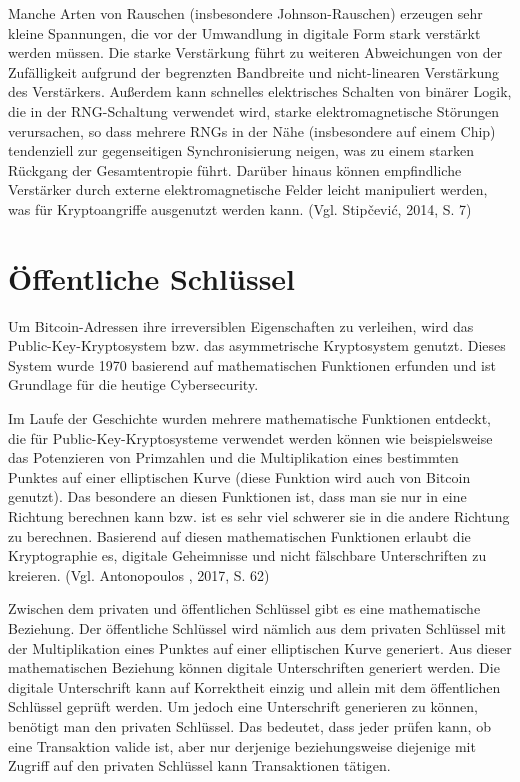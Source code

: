 Manche Arten von Rauschen (insbesondere Johnson-Rauschen) erzeugen sehr kleine Spannungen, die vor der Umwandlung in digitale Form stark verstärkt
werden müssen. Die starke Verstärkung führt zu weiteren Abweichungen von der Zufälligkeit aufgrund der begrenzten Bandbreite und nicht-linearen 
Verstärkung des Verstärkers. Außerdem kann schnelles elektrisches Schalten von binärer Logik, die in der RNG-Schaltung verwendet wird, starke 
elektromagnetische Störungen verursachen, so dass mehrere RNGs in der Nähe (insbesondere auf einem Chip) tendenziell zur gegenseitigen 
Synchronisierung neigen, was zu einem starken Rückgang der Gesamtentropie führt. Darüber hinaus können empfindliche Verstärker durch externe 
elektromagnetische Felder leicht manipuliert werden, was für Kryptoangriffe ausgenutzt werden kann. (Vgl. Stipčević, 2014, S. 7)


\section{Öffentliche Schlüssel}
Um Bitcoin-Adressen ihre irreversiblen Eigenschaften zu verleihen, wird das Public-Key-Kryptosystem bzw. das asymmetrische
Kryptosystem genutzt. Dieses System wurde 1970 basierend auf mathematischen Funktionen erfunden und ist Grundlage für die heutige
Cybersecurity.

Im Laufe der Geschichte wurden mehrere mathematische Funktionen entdeckt, die für Public-Key-Kryptosysteme verwendet werden können
wie beispielsweise das Potenzieren von Primzahlen und die Multiplikation eines bestimmten Punktes auf einer elliptischen Kurve
(diese Funktion wird auch von Bitcoin genutzt). Das besondere an diesen Funktionen ist, dass man sie nur in eine Richtung
berechnen kann bzw. ist es sehr viel schwerer sie in die andere Richtung zu berechnen. Basierend auf diesen mathematischen
Funktionen erlaubt die Kryptographie es, digitale Geheimnisse und nicht fälschbare Unterschriften zu kreieren. (Vgl. Antonopoulos
, 2017, S. 62)

Zwischen dem privaten und öffentlichen Schlüssel gibt es eine mathematische Beziehung. Der öffentliche Schlüssel wird nämlich
aus dem privaten Schlüssel mit der Multiplikation eines Punktes auf einer elliptischen Kurve generiert. Aus dieser mathematischen
Beziehung können digitale Unterschriften generiert werden. Die digitale Unterschrift kann auf Korrektheit einzig und allein mit
dem öffentlichen Schlüssel geprüft werden. Um jedoch eine Unterschrift generieren zu können, benötigt man den privaten Schlüssel.
Das bedeutet, dass jeder prüfen kann, ob eine Transaktion valide ist, aber nur derjenige beziehungsweise diejenige mit Zugriff auf den 
privaten Schlüssel kann Transaktionen tätigen.

